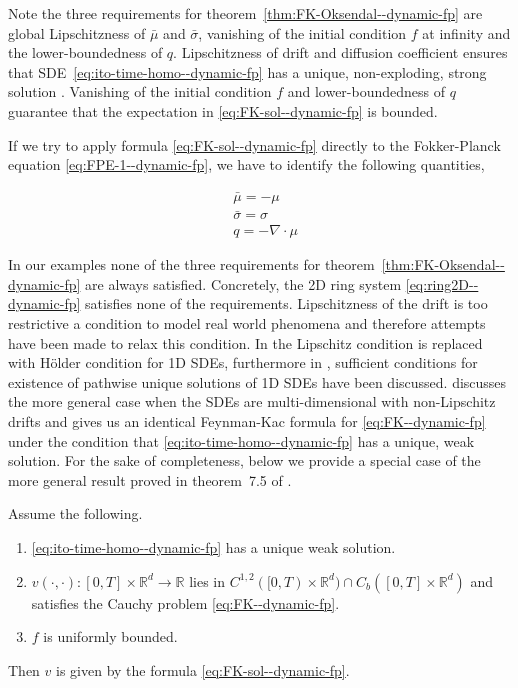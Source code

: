 Note the three requirements for theorem~\ref{thm:FK-Oksendal--dynamic-fp} are global Lipschitzness of $\bar\mu$ and $\bar\sigma$, vanishing of the initial condition $f$ at infinity and the lower-boundedness of $q$. Lipschitzness of drift and diffusion coefficient ensures that SDE~\eqref{eq:ito-time-homo--dynamic-fp} has a unique, non-exploding, strong solution \cite{ikeda2014stochastic}. Vanishing of the initial condition $f$ and lower-boundedness of $q$ guarantee that the expectation in \eqref{eq:FK-sol--dynamic-fp} is bounded.

If we try to apply formula \eqref{eq:FK-sol--dynamic-fp} directly to the Fokker-Planck equation \eqref{eq:FPE-1--dynamic-fp}, we have to identify the following quantities,

\begin{equation}
\begin{aligned}
    &\bar\mu = -\mu\\
    &\bar\sigma =\sigma\\
    & q = -\nabla\cdot\mu
\end{aligned}
\end{equation}

In our examples none of the three requirements for theorem~\ref{thm:FK-Oksendal--dynamic-fp} are always satisfied. Concretely, the 2D ring system \eqref{eq:ring2D--dynamic-fp} satisfies none of the requirements. Lipschitzness of the drift is too restrictive a condition to model real world phenomena and therefore attempts have been made to relax this condition. In \cite{yamada1971uniqueness} the Lipschitz condition is replaced with Hölder condition for 1D SDEs, furthermore in \cite{fu2010stochastic}, \cite{li2011strong} sufficient conditions for existence of pathwise unique solutions of 1D SDEs have been discussed. \cite{xi2019jump} discusses the more general case when the SDEs are multi-dimensional with non-Lipschitz drifts and gives us an identical Feynman-Kac formula for \eqref{eq:FK--dynamic-fp} under the condition that \eqref{eq:ito-time-homo--dynamic-fp} has a unique, weak solution. For the sake of completeness, below we provide a special case of the more general result proved in theorem~7.5 of \cite{xi2019jump}.

\begin{thm} Assume the following.
\begin{enumerate}
    \item \eqref{eq:ito-time-homo--dynamic-fp} has a unique weak solution.
    \item $v(\cdot,\cdot):[0, T]\times\mathbb R^d\to\mathbb R$ lies in $C^{1,2}([0, T)\times\mathbb R^d)\cap C_b([0, T]\times\mathbb R^d)$ and satisfies the Cauchy problem \eqref{eq:FK--dynamic-fp}.
    \item $f$ is uniformly bounded.
\end{enumerate}
Then $v$ is given by the formula \eqref{eq:FK-sol--dynamic-fp}.
\end{thm}







